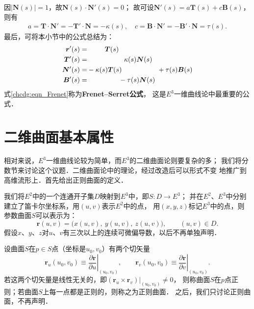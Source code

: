 因$|\boldsymbol{N}(s)|=1$，故$\boldsymbol{N}(s) \cdot \boldsymbol{N}'(s)=0$；
故可设$\boldsymbol{N}'(s)=a \boldsymbol{T}(s) + c \boldsymbol{B}(s)$，则有
\begin{align*}
    a = \boldsymbol{T} \cdot \boldsymbol{N}' = -\boldsymbol{T}' \cdot \boldsymbol{N} = - \kappa(s), \quad
    c = \boldsymbol{B} \cdot \boldsymbol{N}' = -\boldsymbol{B}' \cdot \boldsymbol{N} = \tau(s). 
\end{align*}
最后，可将本小节中的公式总结为：
\begin{subequations}\label{chcdg:eqn_Frenet}
    \begin{align}
        \boldsymbol{r}'(s) =& \hphantom{-\kappa(s)} \boldsymbol{T}(s) \label{chcdg:eqn_Freneta} \\
        \boldsymbol{T}'(s) =& \hphantom{-\kappa(s) \boldsymbol{T}(s) - }
           \kappa(s) \boldsymbol{N}(s) \label{chcdg:eqn_Frenetb}\\
        \boldsymbol{N}'(s) =& -\kappa(s) \boldsymbol{T}(s) \hphantom{-\kappa(s) \boldsymbol{N}(s), }
           +\tau(s) \boldsymbol{B}(s) \label{chcdg:eqn_Frenetc}\\
        \boldsymbol{B}'(s) =& \hphantom{-\kappa(s) \boldsymbol{T}(s)} 
         -\tau(s) \boldsymbol{N}(s)  \label{chcdg:eqn_Frenetd}
    \end{align}
\end{subequations}
式\eqref{chcdg:eqn_Frenet}称为{\bfseries \heiti Frenet--Serret公式}，
这是$E^3$一维曲线论中最重要的公式．

\section{二维曲面基本属性}


相对来说，$E^3$一维曲线论较为简单，而$E^3$的二维曲面论则要复杂的多；
我们将分数节来讨论这个议题．二维曲面论中的理论，经过改造后可以形式不变
地推广到高维流形上．首先给出正则曲面的定义．

我们将$E^2$中的一个连通开子集$D$映射到$E^3$中，即$S:D\to E^3$；
并在$E^2$、$E^3$中分别建立了笛卡尔坐标系，用$(u,v)$表示$E^2$中的点，
用$(x,y,z)$标记$E^3$中的点，则{\kaishu 参数曲面}$S$可以表示为：
\begin{equation}
    \boldsymbol{r}(u,v) = \bigl(x(u,v), \  y(u,v),\  z(u,v)\bigr),
    \qquad (u,v)\in D.
\end{equation}
假设$x$、$y$、$z$对$u$、$v$有三次以上的连续可微偏导数，以后不再单独声明．


设曲面$S$在$p\in S$点（坐标是$u_0,v_0$）有两个切矢量
\begin{equation}\label{chcdg:eqn_rurv}
    \boldsymbol{r}_u (u_0,v_0) \equiv \left. \frac{\partial \boldsymbol{r}}{\partial u} \right|_{(u_0,v_0)},\qquad
    \boldsymbol{r}_v (u_0,v_0) \equiv \left. \frac{\partial \boldsymbol{r}}{\partial v} \right|_{(u_0,v_0)}.
\end{equation}
若这两个切矢量是线性无关的，即$(\boldsymbol{r}_u\times   \boldsymbol{r}_v)|_{(u_0,v_0)} \neq 0$，
则称曲面$S$在$p$点{\heiti 正则}；若曲面$S$上每一点都是正则的，则称之为{\heiti 正则曲面}．
之后，我们只讨论正则曲面，不再声明．


